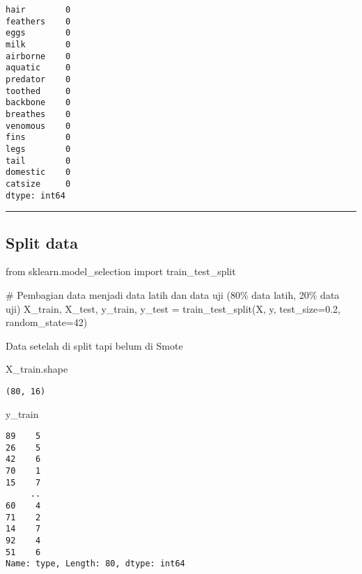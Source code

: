 \documentclass[
  letterpaper,
]{krantz}
\makeatletter
\newenvironment{Shaded}{\begin{snugshade}}{\end{snugshade}}
\newcommand{\CommentTok}[1]{\textcolor[rgb]{0.37,0.37,0.37}{#1}}
\newcommand{\DecValTok}[1]{\textcolor[rgb]{0.68,0.00,0.00}{#1}}
\newcommand{\FloatTok}[1]{\textcolor[rgb]{0.68,0.00,0.00}{#1}}
\newcommand{\ImportTok}[1]{\textcolor[rgb]{0.00,0.46,0.62}{#1}}
\newcommand{\NormalTok}[1]{\textcolor[rgb]{0.00,0.23,0.31}{#1}}
\newcommand{\OperatorTok}[1]{\textcolor[rgb]{0.37,0.37,0.37}{#1}}
\newenvironment{kframe}{%
\medskip{}
\setlength{\fboxsep}{.8em}
 \def\at@end@of@kframe{}%
 \ifinner\ifhmode%
  \def\at@end@of@kframe{\end{minipage}}%
  \begin{minipage}{\columnwidth}%
 \fi\fi%
 \def\FrameCommand##1{\hskip\@totalleftmargin \hskip-\fboxsep
 \colorbox{shadecolor}{##1}\hskip-\fboxsep
     \hskip-\linewidth \hskip-\@totalleftmargin \hskip\columnwidth}%
 \MakeFramed {\advance\hsize-\width
   \@totalleftmargin\z@ \linewidth\hsize
   \@setminipage}}%
 {\par\unskip\endMakeFramed%
 \at@end@of@kframe}
\renewenvironment{Shaded}{\begin{kframe}}{\end{kframe}}
\makeatother
\begin{document}
\begin{verbatim}
hair        0
feathers    0
eggs        0
milk        0
airborne    0
aquatic     0
predator    0
toothed     0
backbone    0
breathes    0
venomous    0
fins        0
legs        0
tail        0
domestic    0
catsize     0
dtype: int64
\end{verbatim}

\begin{center}\rule{0.5\linewidth}{0.5pt}\end{center}

\hypertarget{split-data}{%
\subsection{Split data}\label{split-data}}

\begin{Shaded}
\begin{Highlighting}[]
\ImportTok{from}\NormalTok{ sklearn.model\_selection }\ImportTok{import}\NormalTok{ train\_test\_split}


\CommentTok{\# Pembagian data menjadi data latih dan data uji (80\% data latih, 20\% data uji)}
\NormalTok{X\_train, X\_test, y\_train, y\_test }\OperatorTok{=}\NormalTok{ train\_test\_split(X, y, test\_size}\OperatorTok{=}\FloatTok{0.2}\NormalTok{, random\_state}\OperatorTok{=}\DecValTok{42}\NormalTok{)}
\end{Highlighting}
\end{Shaded}

Data setelah di split tapi belum di Smote

\begin{Shaded}
\begin{Highlighting}[]
\NormalTok{X\_train.shape}
\end{Highlighting}
\end{Shaded}

\begin{verbatim}
(80, 16)
\end{verbatim}

\begin{Shaded}
\begin{Highlighting}[]
\NormalTok{y\_train}
\end{Highlighting}
\end{Shaded}

\begin{verbatim}
89    5
26    5
42    6
70    1
15    7
     ..
60    4
71    2
14    7
92    4
51    6
Name: type, Length: 80, dtype: int64
\end{verbatim}
\end{document}
